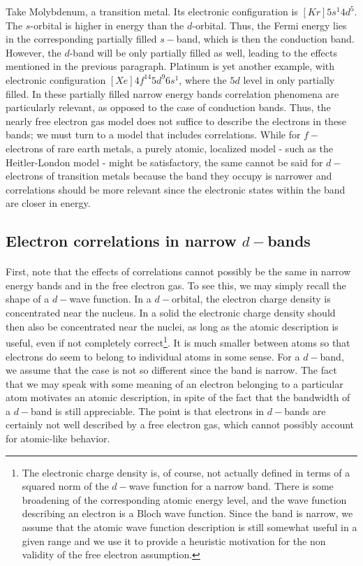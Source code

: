 Take Molybdenum, a transition metal. Its electronic configuration is $[Kr] 5s^1 4d^5$. The $s$-orbital is higher in energy than the $d$-orbital. Thus, the Fermi energy lies in the corresponding partially filled $s-$band, which is then the conduction band. However, the $d$-band will be only partially filled as well, leading to the effects mentioned in the previous paragraph. Platinum is yet another example, with electronic configuration $[Xe]4f^{14} 5d^9 6s^1 $, where the $5d$ level in only partially filled. In these partially filled narrow energy bands correlation phenomena are particularly relevant, as opposed to the case of conduction bands. Thus, the nearly free electron gas model does not suffice to describe the electrons in these bands; we must turn to a model that includes correlations. While for $f-$electrons of rare earth metals, a purely atomic, localized model - such as the Heitler-London model - might be satisfactory, the same cannot be said for $d-$electrons of transition metals because the band they occupy is narrower and correlations should be more relevant since the electronic states within the band are closer in energy.

\subsection{Electron correlations in narrow $d-$bands}\paragraph{}

First, note that the effects of correlations cannot possibly be the same in narrow energy bands and in the free electron gas. To see this, we may simply recall the shape of a $d-$wave function. In a $d-$orbital, the electron charge density is concentrated near the nucleus. In a solid the electronic charge density should then also be concentrated near the nuclei, as long as the atomic description is useful, even if not completely correct\footnote{The electronic charge density is, of course, not actually defined in terms of a squared norm of the $d-$wave function for a narrow band. There is some broadening of the corresponding atomic energy level, and the wave function describing an electron is a Bloch wave function. Since the band is narrow, we assume that the atomic wave function description is still somewhat useful in a given range and we use it to provide a heuristic motivation for the non validity of the free electron assumption.}. It is much smaller between atoms so that electrons do seem to belong to individual atoms in some sense. For a $d-$band, we assume that the case is not so different since the band is narrow. The fact that we may speak with some meaning of an electron belonging to a particular atom motivates an atomic description, in spite of the fact that the bandwidth of a $d-$band is still appreciable. The point is that electrons in $d-$bands are certainly not well described by a free electron gas, which cannot possibly account for atomic-like behavior.


